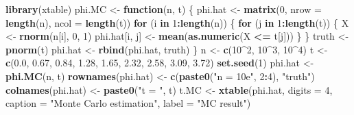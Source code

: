\documentclass[]{book}
\newenvironment{Shaded}{\begin{snugshade}}{\end{snugshade}}
\newcommand{\ControlFlowTok}[1]{\textcolor[rgb]{0.13,0.29,0.53}{\textbf{#1}}}
\newcommand{\DataTypeTok}[1]{\textcolor[rgb]{0.13,0.29,0.53}{#1}}
\newcommand{\DecValTok}[1]{\textcolor[rgb]{0.00,0.00,0.81}{#1}}
\newcommand{\FloatTok}[1]{\textcolor[rgb]{0.00,0.00,0.81}{#1}}
\newcommand{\KeywordTok}[1]{\textcolor[rgb]{0.13,0.29,0.53}{\textbf{#1}}}
\newcommand{\NormalTok}[1]{#1}
\newcommand{\OperatorTok}[1]{\textcolor[rgb]{0.81,0.36,0.00}{\textbf{#1}}}
\newcommand{\StringTok}[1]{\textcolor[rgb]{0.31,0.60,0.02}{#1}}
\begin{document}
\begin{Shaded}
\begin{Highlighting}[]
\KeywordTok{library}\NormalTok{(xtable)}
\NormalTok{phi.MC <-}\StringTok{ }\ControlFlowTok{function}\NormalTok{(n, t) \{}
\NormalTok{  phi.hat <-}\StringTok{ }\KeywordTok{matrix}\NormalTok{(}\DecValTok{0}\NormalTok{, }\DataTypeTok{nrow =} \KeywordTok{length}\NormalTok{(n), }\DataTypeTok{ncol =} \KeywordTok{length}\NormalTok{(t))}
  \ControlFlowTok{for}\NormalTok{ (i }\ControlFlowTok{in} \DecValTok{1}\OperatorTok{:}\KeywordTok{length}\NormalTok{(n)) \{}
    \ControlFlowTok{for}\NormalTok{ (j }\ControlFlowTok{in} \DecValTok{1}\OperatorTok{:}\KeywordTok{length}\NormalTok{(t)) \{}
\NormalTok{      X <-}\StringTok{ }\KeywordTok{rnorm}\NormalTok{(n[i], }\DecValTok{0}\NormalTok{, }\DecValTok{1}\NormalTok{)}
\NormalTok{      phi.hat[i, j] <-}\StringTok{ }\KeywordTok{mean}\NormalTok{(}\KeywordTok{as.numeric}\NormalTok{(X }\OperatorTok{<=}\StringTok{ }\NormalTok{t[j]))}
\NormalTok{    \}}
\NormalTok{  \}}
\NormalTok{truth <-}\StringTok{ }\KeywordTok{pnorm}\NormalTok{(t)}
\NormalTok{phi.hat <-}\StringTok{ }\KeywordTok{rbind}\NormalTok{(phi.hat, truth)}
\NormalTok{\}}
\NormalTok{n <-}\StringTok{ }\KeywordTok{c}\NormalTok{(}\DecValTok{10}\OperatorTok{^}\DecValTok{2}\NormalTok{, }\DecValTok{10}\OperatorTok{^}\DecValTok{3}\NormalTok{, }\DecValTok{10}\OperatorTok{^}\DecValTok{4}\NormalTok{)}
\NormalTok{t <-}\StringTok{ }\KeywordTok{c}\NormalTok{(}\FloatTok{0.0}\NormalTok{, }\FloatTok{0.67}\NormalTok{, }\FloatTok{0.84}\NormalTok{, }\FloatTok{1.28}\NormalTok{, }\FloatTok{1.65}\NormalTok{, }\FloatTok{2.32}\NormalTok{, }\FloatTok{2.58}\NormalTok{, }\FloatTok{3.09}\NormalTok{, }\FloatTok{3.72}\NormalTok{)}
\KeywordTok{set.seed}\NormalTok{(}\DecValTok{1}\NormalTok{)}
\NormalTok{phi.hat <-}\StringTok{ }\KeywordTok{phi.MC}\NormalTok{(n, t)}
\KeywordTok{rownames}\NormalTok{(phi.hat) <-}\StringTok{ }\KeywordTok{c}\NormalTok{(}\KeywordTok{paste0}\NormalTok{(}\StringTok{"n = 10e"}\NormalTok{, }\DecValTok{2}\OperatorTok{:}\DecValTok{4}\NormalTok{), }\StringTok{"truth"}\NormalTok{)}
\KeywordTok{colnames}\NormalTok{(phi.hat) <-}\StringTok{ }\KeywordTok{paste0}\NormalTok{(}\StringTok{"t = "}\NormalTok{, t)}
\NormalTok{t.MC <-}\StringTok{ }\KeywordTok{xtable}\NormalTok{(phi.hat, }\DataTypeTok{digits =} \DecValTok{4}\NormalTok{, }\DataTypeTok{caption =} \StringTok{"Monte Carlo estimation"}\NormalTok{, }
               \DataTypeTok{label =} \StringTok{"MC result"}\NormalTok{)}
\end{Highlighting}
\end{Shaded}
\end{document}
